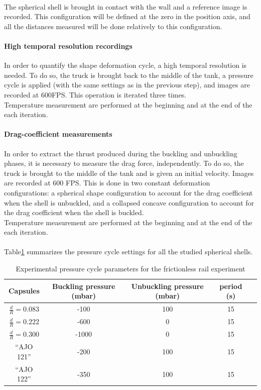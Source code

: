 \paragraph{}
The spherical shell is brought in contact with the wall and a reference image is recorded. This configuration will be defined at the zero in the position axis, and all the distances measured will be done relatively to this configuration.
\paragraph{High temporal resolution recordings}
In order to quantify the shape deformation cycle, a high temporal resolution is needed. To do so, the truck is brought back to the middle of the tank, a pressure cycle is applied (with the same settings as in the previous step), and images are recorded at 600FPS. This operation is iterated three times.\\
Temperature measurement are performed at the beginning and at the end of the each iteration.
\paragraph{Drag-coefficient measurements}
In order to extract the thrust produced during the buckling and unbuckling phases, it is necessary to measure the drag force, independently. To do so, the truck is brought to the middle of the tank and is given an initial velocity. Images are recorded at 600 FPS. This is done in two constant deformation configurations: a spherical shape configuration to account for the drag coefficient when the shell is unbuckled, and a collapsed concave configuration to account for the drag coefficient when the shell is buckled.\\
Temperature measurement are performed at the beginning and at the end of the each iteration.
\paragraph{}
Table\ref{tab:pressure_cycle_configuration} summarizes the pressure cycle settings for all the studied spherical shells.
\begin{table}[H]
	\centering
		\begin{adjustbox}{width=\textwidth}
			\begin{tabular}{|c|c|c|c|c|}
				\hline
				Capsules & Buckling pressure (mbar) & Unbuckling pressure (mbar)&period (s)\\
				\hline
				$\frac{d}{R} = 0.083 $ & -100& 100 & 15\\
				$\frac{d}{R} = 0.222 $ & -600& 0 & 15\\
				$\frac{d}{R} = 0.300 $ & -1000 &  0 & 15\\
				\hline
				"`AJO 121"'& -200 & 100 & 15\\
				"`AJO 122"'& -350 & 100 & 15\\
				\hline
			\end{tabular}
		\end{adjustbox}
	\caption{Experimental pressure cycle parameters for the frictionless rail experiment}
	\label{tab:pressure_cycle_configuration}
\end{table}
